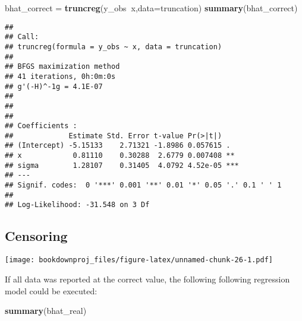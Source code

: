 \documentclass[
]{article}
\newenvironment{Shaded}{\begin{snugshade}}{\end{snugshade}}
\newcommand{\DataTypeTok}[1]{\textcolor[rgb]{0.13,0.29,0.53}{#1}}
\newcommand{\DecValTok}[1]{\textcolor[rgb]{0.00,0.00,0.81}{#1}}
\newcommand{\KeywordTok}[1]{\textcolor[rgb]{0.13,0.29,0.53}{\textbf{#1}}}
\newcommand{\NormalTok}[1]{#1}
\newcommand{\OperatorTok}[1]{\textcolor[rgb]{0.81,0.36,0.00}{\textbf{#1}}}
\newcommand{\StringTok}[1]{\textcolor[rgb]{0.31,0.60,0.02}{#1}}
\begin{document}
\begin{Shaded}
\begin{Highlighting}[]
\NormalTok{bhat_correct =}\StringTok{ }\KeywordTok{truncreg}\NormalTok{(y_obs}\OperatorTok{~}\NormalTok{x,}\DataTypeTok{data=}\NormalTok{truncation)}
\KeywordTok{summary}\NormalTok{(bhat_correct)}
\end{Highlighting}
\end{Shaded}

\begin{verbatim}
## 
## Call:
## truncreg(formula = y_obs ~ x, data = truncation)
## 
## BFGS maximization method
## 41 iterations, 0h:0m:0s 
## g'(-H)^-1g = 4.1E-07 
##  
## 
## 
## Coefficients :
##             Estimate Std. Error t-value Pr(>|t|)    
## (Intercept) -5.15133    2.71321 -1.8986 0.057615 .  
## x            0.81110    0.30288  2.6779 0.007408 ** 
## sigma        1.28107    0.31405  4.0792 4.52e-05 ***
## ---
## Signif. codes:  0 '***' 0.001 '**' 0.01 '*' 0.05 '.' 0.1 ' ' 1
## 
## Log-Likelihood: -31.548 on 3 Df
\end{verbatim}

\hypertarget{censoring}{%
\subsection{Censoring}\label{censoring}}

\begin{Shaded}
\end{Shaded}

\texttt{[image: bookdownproj\_files/figure-latex/unnamed-chunk-26-1.pdf]}

If all data was reported at the correct value, the following following regression model could be executed:

\begin{Shaded}
\begin{Highlighting}[]
\KeywordTok{summary}\NormalTok{(bhat_real)}
\end{Highlighting}
\end{Shaded}
\end{document}
